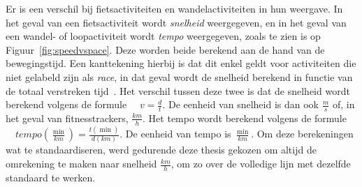 Er is een verschil bij fietsactiviteiten en wandelactiviteiten in hun weergave.
In het geval van een fietsactiviteit wordt \textit{snelheid} weergegeven, en in
het geval van een wandel- of loopactiviteit wordt \textit{tempo} weergegeven,
zoals te zien is op Figuur~\ref{fig:speedvspace}. Deze worden beide berekend
aan de hand van de bewegingstijd. Een kanttekening hierbij is dat dit enkel
geldt voor activiteiten die niet gelabeld zijn als \textit{race}, in dat geval
wordt de snelheid berekend in functie van de totaal verstreken
tijd~\cite{MovingTi80:online}. Het verschil tussen deze twee is dat de snelheid
wordt berekend volgens de formule $ \quad v = \frac{d}{t}$. De eenheid van
snelheid is dan ook $\frac{m}{s}$ of, in het geval van fitnesstrackers,
$\frac{km}{h}$. Het tempo wordt berekend volgens de formule $ \quad
    tempo(\frac{\min}{km}) = \frac{t(\min)}{d(km)}$. De eenheid van tempo is
$\frac{\min}{km}$. Om deze berekeningen wat te standaardiseren, werd gedurende
deze thesis gekozen om altijd de omrekening te maken naar snelheid
$\frac{km}{h}$, om zo over de volledige lijn met dezelfde standaard te werken.

